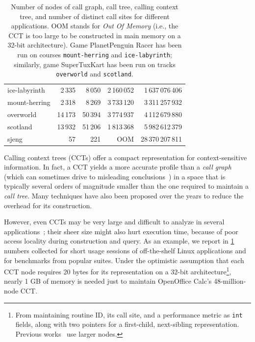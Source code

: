 \begin{table}[ht]
\begin{small}
\begin{tabular}{|l|r r r r|}
ice-labyrinth & 2\,335 & 8\,050 & 2\,160\,052 & 1\,637\,076\,406 \\
mount-herring & 2\,318 & 8\,269 & 3\,733\,120 & 3\,311\,257\,932 \\
overworld & 14\,173 & 50\,394 & 3\,774\,937 & 4\,112\,679\,880 \\
scotland & 13\,932 & 51\,206 & 1\,813\,368 & 5\,982\,612\,379 \\
sjeng & 57 & 221 & OOM & 28\,370\,207\,811 \\
\hline
\end{tabular}
\vspace{4mm}
\caption{\label{tab:hcct-CCTsize} Number of nodes of call graph, call tree, calling context tree, and number of distinct call sites for different applications. OOM stands for {\em Out Of Memory} (i.e., the CCT is too large to be constructed in main memory on a 32-bit architecture). Game PlanetPenguin Racer has been run on courses {\tt mount-herring} and {\tt ice-labyrinth}; similarly, game SuperTuxKart has been run on tracks {\tt overworld} and {\tt scotland}. }
\end{small}
\end{table}
\ifauthorea{\newline}{\vspace{-6mm}}

Calling context trees (CCTs) offer a compact representation for context-sensitive information. In fact, a CCT yields a more accurate profile than a {\em call graph} (which can sometimes drive to misleading conclusions~\cite{Ponder88, Spivey04}) in a space that is typically several orders of magnitude smaller than the one required to maintain a {\em call tree}. Many techniques have also been proposed over the years to reduce the overhead for its construction.

However, even CCTs may be very large and difficult to analyze in several applications~\cite{Bond07,Zhuang06}; their sheer size might also hurt execution time, because of poor access locality during construction and query. As an example, we report in \mytable\ref{tab:hcct-CCTsize} numbers collected for short usage sessions of off-the-shelf Linux applications and for benchmarks from popular suites. Under the optimistic assumption that each CCT node requires 20 bytes for its representation on a 32-bit architecture\footnote{From maintaining routine ID, its call site, and a performance metric as {\tt int} fields, along with two pointers for a first-child, next-sibling representation. Previous works~\cite{Ammons97,Spivey04} use larger nodes.}, nearly 1 GB of memory is needed just to maintain OpenOffice Calc's 48-million-node CCT.


